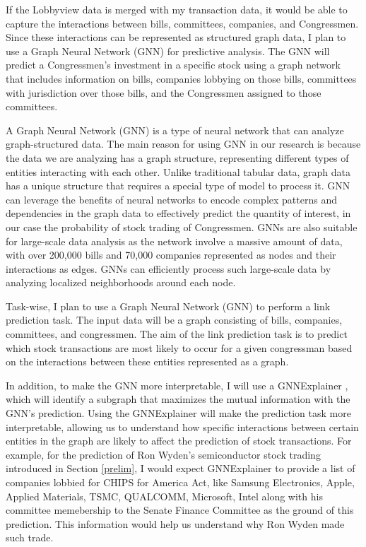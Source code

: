 \documentclass[15pt,letterpaper]{article}
\begin{document}
If the Lobbyview data is merged with my transaction data, it would be able to capture the interactions between bills, committees, companies, and Congressmen. Since these interactions can be represented as structured graph data, I plan to use a Graph Neural Network (GNN) for predictive analysis. The GNN will predict a Congressmen's investment in a specific stock using a graph network that includes information on bills, companies lobbying on those bills, committees with jurisdiction over those bills, and the Congressmen assigned to those committees.

A Graph Neural Network (GNN) is a type of neural network that can analyze graph-structured data. The main reason for using GNN in our research is because the data we are analyzing has a graph structure, representing different types of entities interacting with each other. Unlike traditional tabular data, graph data has a unique structure that requires a special type of model to process it. GNN can leverage the benefits of neural networks to encode complex patterns and dependencies in the graph data to effectively predict the quantity of interest, in our case the probability of stock trading of Congressmen. GNNs are also suitable for large-scale data analysis as the network involve a massive amount of data, with over 200,000 bills and 70,000 companies represented as nodes and their interactions as edges. GNNs can efficiently process such large-scale data by analyzing localized neighborhoods around each node.

Task-wise, I plan to use a Graph Neural Network (GNN) to perform a link prediction task. The input data will be a graph consisting of bills, companies, committees, and congressmen. The aim of the link prediction task is to predict which stock transactions are most likely to occur for a given congressman based on the interactions between these entities represented as a graph.

In addition, to make the GNN more interpretable, I will use a GNNExplainer \citep{gnne}, which will identify a subgraph that maximizes the mutual information with the GNN's prediction. 
Using the GNNExplainer will make the prediction task more interpretable, allowing us to understand how specific interactions between certain entities in the graph are likely to affect the prediction of stock transactions.
For example, for the prediction of Ron Wyden's semiconductor stock trading introduced in Section \ref{prelim}, I would expect GNNExplainer to provide a list of companies lobbied for CHIPS for America Act, like Samsung Electronics, Apple, Applied Materials, TSMC, QUALCOMM, Microsoft, Intel along with his committee memebership to the Senate Finance Committee as the ground of this prediction.
This information would help us understand why Ron Wyden made such trade.
\end{document}
